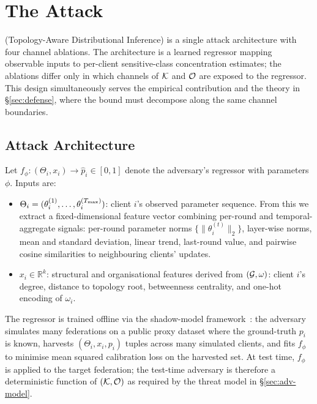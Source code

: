 \section{The \TADI Attack}
\label{sec:attack}

\TADI (Topology-Aware Distributional Inference) is a single attack
architecture with four channel ablations. The architecture is a learned
regressor mapping observable inputs to per-client sensitive-class
concentration estimates; the ablations differ only in which channels
of $\mathcal{K}$ and $\mathcal{O}$ are exposed to the regressor. This design
simultaneously serves the empirical contribution and the theory in
\S\ref{sec:defense}, where the bound must decompose along the same
channel boundaries.

\subsection{Attack Architecture}
\label{sec:attack-arch}

Let $f_\phi : (\Theta_i, x_i) \to \hat p_i \in [0,1]$ denote the
adversary's regressor with parameters $\phi$. Inputs are:

\begin{itemize}[topsep=2pt,itemsep=2pt,leftmargin=*]
\item $\Theta_i = (\theta_i^{(1)},\ldots,\theta_i^{(T_{\max})})$: client
  $i$'s observed parameter sequence. From this we extract a
  fixed-dimensional feature vector combining per-round and
  temporal-aggregate signals: per-round parameter norms
  $\{\|\theta_i^{(t)}\|_2\}$, layer-wise norms, mean and standard
  deviation, linear trend, last-round value, and pairwise cosine
  similarities to neighbouring clients' updates.
\item $x_i \in \mathbb{R}^k$: structural and organisational features
  derived from $(\mathcal{G},\omega)$: client $i$'s degree, distance to
  topology root, betweenness centrality, and one-hot encoding of
  $\omega_i$.
\end{itemize}

The regressor is trained offline via the shadow-model
framework~\cite{shokri2017membership}: the adversary simulates many
federations on a public proxy dataset where the ground-truth $p_i$ is
known, harvests $(\Theta_i, x_i, p_i)$ tuples across many simulated
clients, and fits $f_\phi$ to minimise mean squared calibration loss on
the harvested set. At test time, $f_\phi$ is applied to the target
federation; the test-time adversary is therefore a deterministic
function of $(\mathcal{K},\mathcal{O})$ as required by the threat model in
\S\ref{sec:adv-model}.

